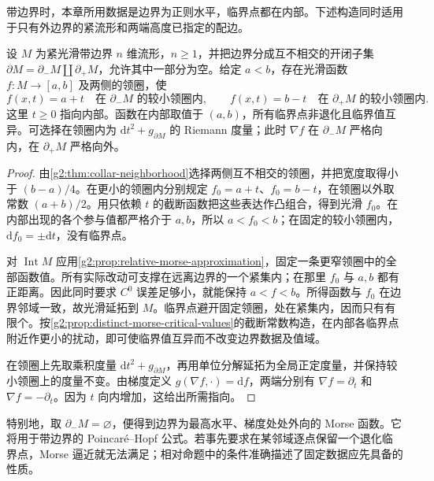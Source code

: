 带边界时，本章所用数据是边界为正则水平，临界点都在内部。下述构造同时适用于只有外边界的紧流形和两端高度已指定的配边。

\begin{proposition}\label{g2:prop:boundary-morse-function}
	设 \(M\) 为紧光滑带边界 \(n\) 维流形，\(n\ge1\)，并把边界分成互不相交的开闭子集 \(\partial M=\partial_-M\amalg\partial_+M\)，允许其中一部分为空。给定 \(a<b\)，存在光滑函数 \(f:M\to[a,b]\) 及两侧的领圈，使
	\[
		f(x,t)=a+t\quad\text{在 }\partial_-M\text{ 的较小领圈内},\qquad
		f(x,t)=b-t\quad\text{在 }\partial_+M\text{ 的较小领圈内}.
	\]
	这里 \(t\ge0\) 指向内部。函数在内部取值于 \((a,b)\)，所有临界点非退化且临界值互异。可选择在领圈内为 \(\mathrm dt^2+g_{\partial M}\) 的 Riemann 度量；此时 \(\nabla f\) 在 \(\partial_-M\) 严格向内，在 \(\partial_+M\) 严格向外。
\end{proposition}
\begin{proof}
	由\cref{g2:thm:collar-neighborhood}选择两侧互不相交的领圈，并把宽度取得小于 \((b-a)/4\)。在更小的领圈内分别规定 \(f_0=a+t\)、\(f_0=b-t\)，在领圈以外取常数 \((a+b)/2\)。用只依赖 \(t\) 的截断函数把这些表达作凸组合，得到光滑 \(f_0\)。在内部出现的各个参与值都严格介于 \(a,b\)，所以 \(a<f_0<b\)；在固定的较小领圈内，\(\mathrm df_0=\pm\mathrm dt\)，没有临界点。

	对 \(\operatorname{Int}M\) 应用\cref{g2:prop:relative-morse-approximation}，固定一条更窄领圈中的全部函数值。所有实际改动可支撑在远离边界的一个紧集内；在那里 \(f_0\) 与 \(a,b\) 都有正距离。因此同时要求 \(C^0\) 误差足够小，就能保持 \(a<f<b\)。所得函数与 \(f_0\) 在边界邻域一致，故光滑延拓到 \(M\)。临界点避开固定领圈，处在紧集内，因而只有有限个。按\cref{g2:prop:distinct-morse-critical-values}的截断常数构造，在内部各临界点附近作更小的扰动，即可使临界值互异而不改变边界数据及值域。

	在领圈上先取乘积度量 \(\mathrm dt^2+g_{\partial M}\)，再用单位分解延拓为全局正定度量，并保持较小领圈上的度量不变。由梯度定义 \(g(\nabla f,\cdot)=\mathrm df\)，两端分别有 \(\nabla f=\partial_t\) 和 \(\nabla f=-\partial_t\)。因为 \(t\) 向内增加，这给出所需指向。
\end{proof}

特别地，取 \(\partial_-M=\varnothing\)，便得到边界为最高水平、梯度处处外向的 Morse 函数。它将用于带边界的 Poincaré--Hopf 公式。若事先要求在某邻域逐点保留一个退化临界点，Morse 逼近就无法满足；相对命题中的条件准确描述了固定数据应先具备的性质。
